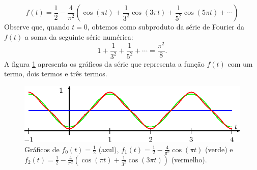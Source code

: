 \begin{ex}
\begin{equation}
f(t)=\frac{1}{2}-\frac{4}{\pi^2}\left(\cos(\pi t)+\frac{1}{3^2}\cos(3\pi t)+\frac{1}{5^2}\cos(5\pi t)+\cdots\right)
\end{equation}
Observe que, quando $t=0$, obtemos como subproduto da série de Fourier da $f(t)$ a soma da seguinte série numérica:
\begin{equation}\label{serie_inv_impar}
1+\frac{1}{3^2}+\frac{1}{5^2}+\cdots=\frac{\pi^2}{8}.
\end{equation}
A figura \ref{fig_conv_triangular} apresenta os gráficos da série que representa a função $f(t)$ com um termo, dois termos e três termos.
\begin{figure}[!ht]
\begin{center}

\includegraphics{cap_series/pics/figura_2}\end{center}
\caption{\label{fig_conv_triangular}Gráficos de $f_0(t)=\frac{1}{2}$ (azul), $f_1(t)=\frac{1}{2}-\frac{4}{\pi^2}\cos(\pi t)$ (verde) e $f_2(t)=\frac{1}{2}-\frac{4}{\pi^2}\left(\cos(\pi t)+\frac{1}{3^2}\cos(3\pi t)\right)$ (vermelho).}
\end{figure}
\end{ex}
